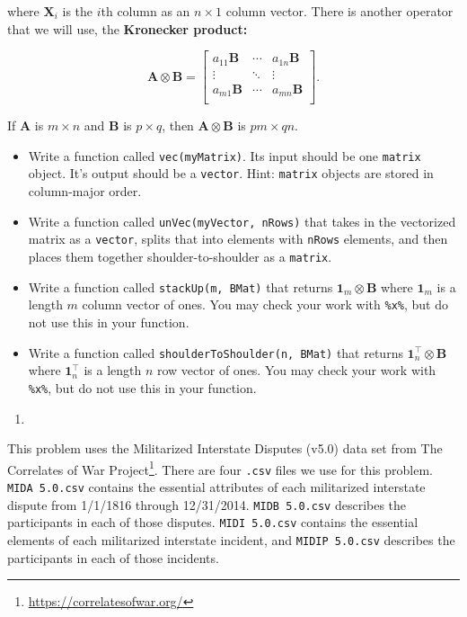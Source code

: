 \documentclass[12pt,krantz2]{krantz}
\providecommand{\tightlist}{%
  \setlength{\itemsep}{0pt}\setlength{\parskip}{0pt}}
\renewcommand{\href}[2]{#2\footnote{\url{#1}}}
\begin{document}
where \(\mathbf{X}_i\) is the \(i\)th column as an \(n \times 1\) column vector. There is another operator that we will use, the \textbf{Kronecker product:}

\begin{equation} 
\mathbf{A} \otimes \mathbf{B} = 
\begin{bmatrix}
a_{11} \mathbf{B} & \cdots & a_{1n} \mathbf{B} \\
\vdots & \ddots & \vdots \\
a_{m1} \mathbf{B} & \cdots & a_{mn} \mathbf{B} \\
\end{bmatrix}.
\end{equation}

If \(\mathbf{A}\) is \(m \times n\) and \(\mathbf{B}\) is \(p \times q\), then \(\mathbf{A} \otimes \mathbf{B}\) is \(pm \times qn\).

\begin{itemize}
\tightlist
\item
  Write a function called \texttt{vec(myMatrix)}. Its input should be one \texttt{matrix} object. It's output should be a \texttt{vector}. Hint: \texttt{matrix} objects are stored in column-major order.
\item
  Write a function called \texttt{unVec(myVector,\ nRows)} that takes in the vectorized matrix as a \texttt{vector}, splits that into elements with \texttt{nRows} elements, and then places them together shoulder-to-shoulder as a \texttt{matrix}.
\item
  Write a function called \texttt{stackUp(m,\ BMat)} that returns \(\mathbf{1}_m \otimes \mathbf{B}\) where \(\mathbf{1}_m\) is a length \(m\) column vector of ones. You may check your work with \texttt{\%x\%}, but do not use this in your function.
\item
  Write a function called \texttt{shoulderToShoulder(n,\ BMat)} that returns \(\mathbf{1}^\intercal_n \otimes \mathbf{B}\) where \(\mathbf{1}_n^\intercal\) is a length \(n\) row vector of ones. You may check your work with \texttt{\%x\%}, but do not use this in your function.
\end{itemize}

\begin{enumerate}
\def\labelenumi{\arabic{enumi}.}
\setcounter{enumi}{3}
\item
\end{enumerate}

This problem uses the Militarized Interstate Disputes (v5.0) \citep{mid5} data set from \href{https://correlatesofwar.org/}{The Correlates of War Project}. There are four \texttt{.csv} files we use for this problem. \texttt{MIDA\ 5.0.csv} contains the essential attributes of each militarized interstate dispute from 1/1/1816 through 12/31/2014. \texttt{MIDB\ 5.0.csv} describes the participants in each of those disputes. \texttt{MIDI\ 5.0.csv} contains the essential elements of each militarized interstate incident, and \texttt{MIDIP\ 5.0.csv} describes the participants in each of those incidents.
\end{document}
